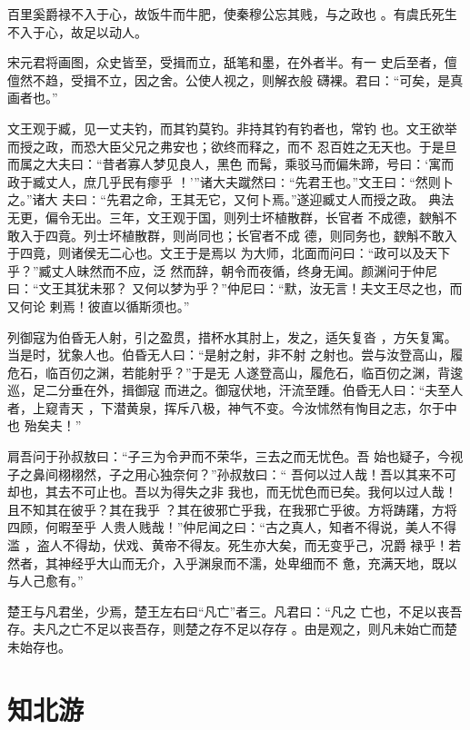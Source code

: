 \documentclass[12pt,UTF8]{ctexbook}
\begin{document}
百里奚爵禄不入于心，故饭牛而牛肥，使秦穆公忘其贱，与之政也 。有虞氏死生不入于心，故足以动人。

宋元君将画图，众史皆至，受揖而立，舐笔和墨，在外者半。有一 史后至者，儃儃然不趋，受揖不立，因之舍。公使人视之，则解衣般 礴裸。君曰：“可矣，是真画者也。”

文王观于臧，见一丈夫钓，而其钓莫钓。非持其钓有钓者也，常钓 也。文王欲举而授之政，而恐大臣父兄之弗安也；欲终而释之，而不 忍百姓之无天也。于是旦而属之大夫曰：“昔者寡人梦见良人，黑色 而髯，乘驳马而偏朱蹄，号曰：‘寓而政于臧丈人，庶几乎民有瘳乎 ！’”诸大夫蹴然曰∶“先君王也。”文王曰：“然则卜之。”诸大 夫曰∶“先君之命，王其无它，又何卜焉。”遂迎臧丈人而授之政。 典法无更，偏令无出。三年，文王观于国，则列士坏植散群，长官者 不成德，斔斛不敢入于四竟。列士坏植散群，则尚同也；长官者不成 德，则同务也，斔斛不敢入于四竟，则诸侯无二心也。文王于是焉以 为大师，北面而问曰：“政可以及天下乎？”臧丈人昧然而不应，泛 然而辞，朝令而夜循，终身无闻。颜渊问于仲尼曰：“文王其犹未邪？ 又何以梦为乎？”仲尼曰：“默，汝无言！夫文王尽之也，而又何论 剌焉！彼直以循斯须也。”

列御寇为伯昏无人射，引之盈贯，措杯水其肘上，发之，适矢复沓 ，方矢复寓。当是时，犹象人也。伯昏无人曰：“是射之射，非不射 之射也。尝与汝登高山，履危石，临百仞之渊，若能射乎？”于是无 人遂登高山，履危石，临百仞之渊，背逡巡，足二分垂在外，揖御寇 而进之。御寇伏地，汗流至踵。伯昏无人曰：“夫至人者，上窥青天 ，下潜黄泉，挥斥八极，神气不变。今汝怵然有恂目之志，尔于中也 殆矣夫！”

肩吾问于孙叔敖曰：“子三为令尹而不荣华，三去之而无忧色。吾 始也疑子，今视子之鼻间栩栩然，子之用心独奈何？”孙叔敖曰：“ 吾何以过人哉！吾以其来不可却也，其去不可止也。吾以为得失之非 我也，而无忧色而已矣。我何以过人哉！且不知其在彼乎？其在我乎 ？其在彼邪亡乎我，在我邪亡乎彼。方将踌躇，方将四顾，何暇至乎 人贵人贱哉！”仲尼闻之曰：“古之真人，知者不得说，美人不得滥 ，盗人不得劫，伏戏、黄帝不得友。死生亦大矣，而无变乎己，况爵 禄乎！若然者，其神经乎大山而无介，入乎渊泉而不濡，处卑细而不 惫，充满天地，既以与人己愈有。”

楚王与凡君坐，少焉，楚王左右曰“凡亡”者三。凡君曰：“凡之 亡也，不足以丧吾存。夫凡之亡不足以丧吾存，则楚之存不足以存存 。由是观之，则凡未始亡而楚未始存也。


\section{知北游}
\end{document}
